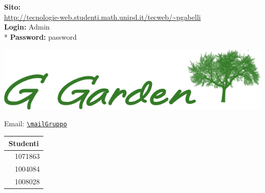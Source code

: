 \thispagestyle{empty}

\begin{titlepage}

	\begin{center}
		\dataUM \\
		\textbf{
			\uni \\
			\cdl \\
			\uniAA \\
		}
		\HRule \\[0.4cm]
			\begin{Huge}
				{\huge \bfseries \titoloDocumento}\\[0.4cm]
			\end{Huge}
		\HRule \\[2.5cm]
		
		\vspace{1cm}
		\textbf{Sito:} \\
		\url{http://tecnologie-web.studenti.math.unipd.it/tecweb/~pgabelli} \\
		\vspace{1cm}
		\textbf{Login:} Admin \\*
		\textbf{Password:} password \\

		
		
		\begin{center}
			\includegraphics[scale=0.75]{./sezioni/img/Logo.png}
		\end{center}
		Email: 
		\href{mailto:\mailGruppo}{\nolinkurl{\mailGruppo} } \\
		\vspace{3cm}
		

		
		\vfill
		\begin{table}[b]
		\begin{center}
			\begin{tabular}{r | l}
				\multicolumn{2}{c}{\textbf{Studenti}}\\
				\midrule
				\AG	&	1071863	\\
				\SM	&	1004084	\\
				\PG	&	1008028	\\
				\midrule
			\end{tabular}
		\end{center}
		\end{table}
	

\end{center}
\end{titlepage}

